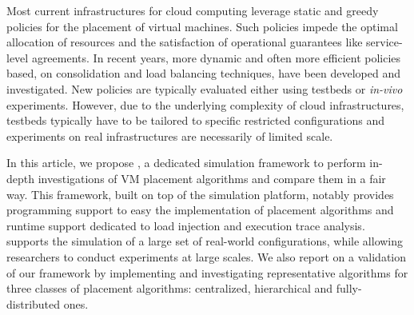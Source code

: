     Most current infrastructures for cloud computing leverage static
    and greedy policies for the placement of virtual machines. Such
    policies impede the optimal allocation of resources and the
    satisfaction of operational guarantees like service-level
    agreements. In recent years, more dynamic and often more efficient
    policies based, \eg on consolidation and load balancing
    techniques, have been developed and investigated. New policies are
    typically evaluated either using testbeds or \emph{in-vivo}
    experiments. However, due to the underlying complexity of cloud
    infrastructures, testbeds typically have to be tailored to
    specific restricted configurations and experiments on real
    infrastructures are necessarily of limited scale.

    In this article, we propose \vmps, a dedicated simulation
    framework to perform in-depth investigations of VM placement
    algorithms and compare them in a fair way. This framework, built
    on top of the \sg simulation platform, notably provides
    programming support to easy the implementation of placement
    algorithms and runtime support dedicated to load injection and
    execution trace analysis. \vmps supports the simulation of a large
    set of real-world configurations, while allowing researchers to
    conduct experiments at large scales. We also report on a
    validation of our framework by implementing and investigating
    representative algorithms for three classes of placement
    algorithms: centralized, hierarchical and fully-distributed ones.
